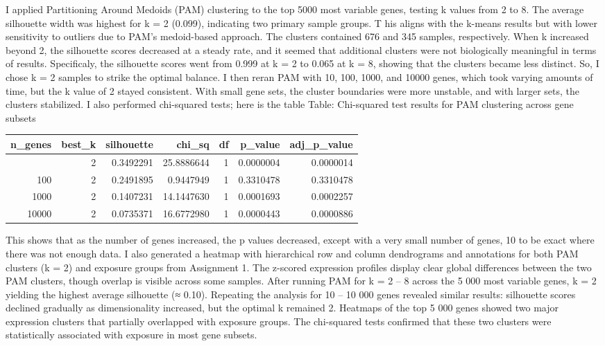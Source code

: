 \documentclass[
]{article}
\newcounter{none} %
\begin{document}
I applied Partitioning Around Medoids (PAM) clustering to the top 5000
most variable genes, testing k values from 2 to 8. The average
silhouette width was highest for k = 2 (0.099), indicating two primary
sample groups. T his aligns with the k-means results but with lower
sensitivity to outliers due to PAM's medoid-based approach. The clusters
contained 676 and 345 samples, respectively. When k increased beyond 2,
the silhouette scores decreased at a steady rate, and it seemed that
additional clusters were not biologically meaningful in terms of
results. Specificaly, the silhouette scores went from 0.999 at k = 2 to
0.065 at k = 8, showing that the clusters became less distinct. So, I
chose k = 2 samples to strike the optimal balance. I then reran PAM with
10, 100, 1000, and 10000 genes, which took varying amounts of time, but
the k value of 2 stayed consistent. With small gene sets, the cluster
boundaries were more unstable, and with larger sets, the clusters
stabilized. I also performed chi-squared tests; here is the table Table:
Chi-squared test results for PAM clustering across gene subsets

{\def\LTcaptype{none} %
\begin{longtable}[]{@{}rrrrrrr@{}}
\toprule\noalign{}
n\_genes & best\_k & silhouette & chi\_sq & df & p\_value &
adj\_p\_value \\
\midrule\noalign{}
\endhead
\bottomrule\noalign{}
\endlastfoot
10 & 2 & 0.3492291 & 25.8886644 & 1 & 0.0000004 & 0.0000014 \\
100 & 2 & 0.2491895 & 0.9447949 & 1 & 0.3310478 & 0.3310478 \\
1000 & 2 & 0.1407231 & 14.1447630 & 1 & 0.0001693 & 0.0002257 \\
10000 & 2 & 0.0735371 & 16.6772980 & 1 & 0.0000443 & 0.0000886 \\
\end{longtable}
}

This shows that as the number of genes increased, the p values
decreased, except with a very small number of genes, 10 to be exact
where there was not enough data. I also generated a heatmap with
hierarchical row and column dendrograms and annotations for both PAM
clusters (k = 2) and exposure groups from Assignment 1. The z-scored
expression profiles display clear global differences between the two PAM
clusters, though overlap is visible across some samples. After running
PAM for k = 2 -- 8 across the 5 000 most variable genes, k = 2 yielding
the highest average silhouette (≈ 0.10). Repeating the analysis for 10
-- 10 000 genes revealed similar results: silhouette scores declined
gradually as dimensionality increased, but the optimal k remained 2.
Heatmaps of the top 5 000 genes showed two major expression clusters
that partially overlapped with exposure groups. The chi-squared tests
confirmed that these two clusters were statistically associated with
exposure in most gene subsets.
\end{document}
